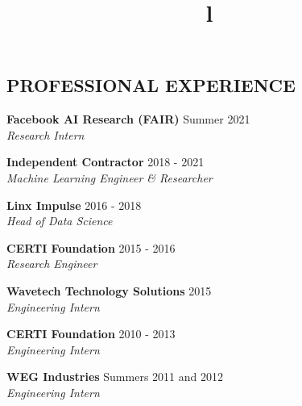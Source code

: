 \documentclass[margin, line]{res}
\begin{document}
\begin{resume}
\section{PROFESSIONAL EXPERIENCE}

\textbf{Facebook AI Research (FAIR)} \hfill Summer 2021\\
{\sl Research Intern}

\textbf{Independent Contractor} \hfill 2018 - 2021\\
{\sl Machine Learning Engineer \& Researcher}

\textbf{Linx Impulse} \hfill 2016 - 2018\\
{\sl Head of Data Science}

\textbf{CERTI Foundation} \hfill 2015 - 2016\\
{\sl Research Engineer}

\textbf{Wavetech Technology Solutions} \hfill 2015\\
{\sl Engineering Intern}

\textbf{CERTI Foundation} \hfill 2010 - 2013\\
{\sl Engineering Intern}

\textbf{WEG Industries}  \hfill Summers 2011 and 2012\\
{\sl Engineering Intern}


\begin{format}
\title{l}\\
\\
\body\\
\end{format}

\end{resume}
\(\)
\end{document}

